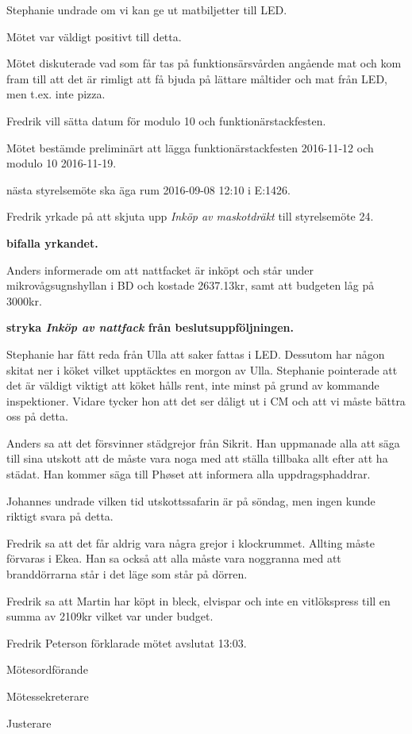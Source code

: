 \documentclass[10pt]{article}
\def\mo{Fredrik Peterson}
\def\ms{Erik Månsson}
\def\ji{Malin Lindström}
\begin{document}
\begin{paragrafer}
Stephanie undrade om vi kan ge ut matbiljetter till LED.

Mötet var väldigt positivt till detta.

Mötet diskuterade vad som får tas på funktionsärsvården angående mat och kom fram till att det är rimligt att få bjuda på lättare måltider och mat från LED, men t.ex. inte pizza.


Fredrik vill sätta datum för modulo 10 och funktionärstackfesten.

Mötet bestämde preliminärt att lägga funktionärstackfesten 2016-11-12 och modulo 10 2016-11-19.

\Mba nästa styrelsemöte ska äga rum 2016-09-08 12:10 i E:1426.

Fredrik yrkade på att skjuta upp \emph{Inköp av maskotdräkt} till styrelsemöte 24.

\textbf{\Mba bifalla yrkandet.}

Anders informerade om att nattfacket är inköpt och står under mikrovågsugnshyllan i BD och kostade 2637.13kr, samt att budgeten låg på 3000kr.

\textbf{\Mba stryka \emph{Inköp av nattfack} från beslutsuppföljningen.}

Stephanie har fått reda från Ulla att saker fattas i LED. Dessutom har någon skitat ner i köket vilket upptäcktes en morgon av Ulla. Stephanie pointerade att det är väldigt viktigt att köket hålls rent, inte minst på grund av kommande inspektioner. Vidare tycker hon att det ser dåligt ut i CM och att vi måste bättra oss på detta.

Anders sa att det försvinner städgrejor från Sikrit. Han uppmanade alla att säga till sina utskott att de måste vara noga med att ställa tillbaka allt efter att ha städat. Han kommer säga till Phøset att informera alla uppdragsphaddrar.

Johannes undrade vilken tid utskottssafarin är på söndag, men ingen kunde riktigt svara på detta.

Fredrik sa att det får aldrig vara några grejor i klockrummet. Allting måste förvaras i Ekea. Han sa också att alla måste vara noggranna med att branddörrarna står i det läge som står på dörren.

Fredrik sa att Martin har köpt in bleck, elvispar och inte en vitlökspress till en summa av 2109kr vilket var under budget.

{\mo} förklarade mötet avslutat 13:03.

\end{paragrafer}

\hidesignfoot
\begin{signatures}{3}
\signature{\mo}{Mötesordförande}
\signature{\ms}{Mötessekreterare}
\signature{\ji}{Justerare}
\end{signatures}
\end{document}
